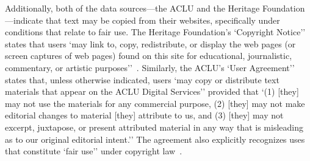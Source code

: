 \documentclass[anonymous,review]{acmart}
\begin{document}
Additionally, both of the data sources---the ACLU and the Heritage Foundation---indicate that text may be copied from their websites, specifically under conditions that relate to fair use. The Heritage Foundation's `Copyright Notice'' states that users `may link to, copy, redistribute, or display the web pages (or screen captures of web pages) found on this site for educational, journalistic, commentary, or artistic purposes''~\cite{heritage_copyright}. Similarly, the ACLU's `User Agreement'' states that, unless otherwise indicated, users `may copy or distribute text materials that appear on the ACLU Digital Services'' provided that `(1) [they] may not use the materials for any commercial purpose, (2) [they] may not make editorial changes to material [they] attribute to us, and (3) [they] may not excerpt, juxtapose, or present attributed material in any way that is misleading as to our original editorial intent.'' The agreement also explicitly recognizes uses that constitute `fair use'' under copyright law~\cite{aclu_user_agreement}.
\end{document}
